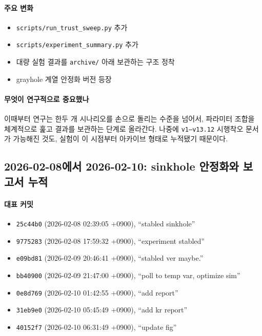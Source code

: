 \documentclass[12pt,a4paper]{article}
\begin{document}
\paragraph{주요 변화}
\begin{itemize}[leftmargin=1.5em]
\item \texttt{scripts/run\_trust\_sweep.py} 추가
\item \texttt{scripts/experiment\_summary.py} 추가
\item 대량 실험 결과를 \texttt{archive/} 아래 보관하는 구조 정착
\item grayhole 계열 안정화 버전 등장
\end{itemize}

\paragraph{무엇이 연구적으로 중요했나}
이때부터 연구는 한두 개 시나리오를 손으로 돌리는 수준을 넘어서,
파라미터 조합을 체계적으로 훑고 결과를 보관하는 단계로 올라간다.
나중에 \texttt{v1--v13.12} 시행착오 문서가 가능해진 것도,
실험이 이 시점부터 아카이브 형태로 누적됐기 때문이다.

\subsection{2026-02-08에서 2026-02-10: sinkhole 안정화와 보고서 누적}

\paragraph{대표 커밋}
\begin{itemize}[leftmargin=1.5em]
\item \texttt{25c44b0} (2026-02-08 02:39:05 +0900), ``stabled sinkhole''
\item \texttt{9775283} (2026-02-08 17:59:32 +0900), ``experiment stabled''
\item \texttt{e09bd81} (2026-02-09 20:46:41 +0900), ``stabled ver maybe.''
\item \texttt{bb40900} (2026-02-09 21:47:00 +0900), ``poll to temp var, optimize sim''
\item \texttt{0e8d769} (2026-02-10 01:42:55 +0900), ``add report''
\item \texttt{31eb9e0} (2026-02-10 05:45:49 +0900), ``add kr report''
\item \texttt{40152f7} (2026-02-10 06:31:49 +0900), ``update fig''
\end{itemize}
\end{document}
